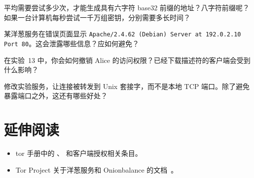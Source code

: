 \begin{esercizio}[1]\label{es:21-vanity}
平均需要尝试多少次，才能生成具有六字符 base32 前缀的地址？八字符前缀呢？如果一台计算机每秒尝试一千万组密钥，分别需要多长时间？
\end{esercizio}

\begin{esercizio}[2]\label{es:21-fuga}
某洋葱服务在错误页面显示 \texttt{Apache/2.4.62 (Debian) Server at 192.0.2.10 Port 80}。这会泄露哪些信息？应如何避免？
\end{esercizio}

\begin{esercizio}[2]\label{es:21-revoca}
在实验~13 中，你会如何撤销 Alice 的访问权限？已经下载描述符的客户端会受到什么影响？
\end{esercizio}

\begin{esercizio}[3]\label{es:21-socket}
修改实验服务，让连接被转发到 Unix 套接字，而不是本地 TCP 端口。除了避免暴露端口之外，这还有哪些好处？
\end{esercizio}

\section*{延伸阅读}
\begin{itemize}
  \item tor 手册中的 、 和客户端授权相关条目。
  \item Tor Project 关于洋葱服务和 Onionbalance 的文档~\cite{onionbalance}。
\end{itemize}

